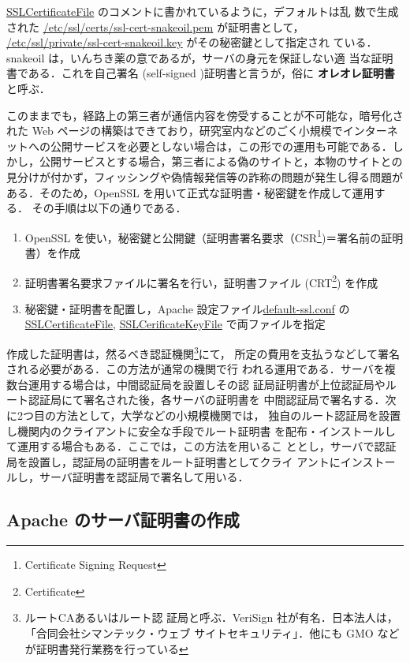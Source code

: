 \url{SSLCertificateFile} のコメントに書かれているように，デフォルトは乱
数で生成された \url{/etc/ssl/certs/ssl-cert-snakeoil.pem} が証明書として，
\url{/etc/ssl/private/ssl-cert-snakeoil.key} がその秘密鍵として指定され
ている．snakeoil は，いんちき薬の意であるが，サーバの身元を保証しない適
当な証明書である．これを自己署名 (self-signed )証明書と言うが，俗に
\textbf{オレオレ証明書}と呼ぶ．

このままでも，経路上の第三者が通信内容を傍受することが不可能な，暗号化さ
れた Web ページの構築はできており，研究室内などのごく小規模でインターネ
ットへの公開サービスを必要としない場合は，この形での運用も可能である．し
かし，公開サービスとする場合，第三者による偽のサイトと，本物のサイトとの
見分けが付かず，フィッシングや偽情報発信等の詐称の問題が発生し得る問題が
ある．そのため，OpenSSL を用いて正式な証明書・秘密鍵を作成して運用する．
その手順は以下の通りである．

\begin{enumerate}
 \item OpenSSL を使い，秘密鍵と公開鍵（証明書署名要求（CSR\footnote{Certificate Signing Request})＝署名前の証明書）を作成
 \item 証明書署名要求ファイルに署名を行い，証明書ファイル (CRT\footnote{Certificate}) を作成
 \item 秘密鍵・証明書を配置し，Apache 設定ファイル\url{default-ssl.conf} の\url{SSLCertificateFile}, \url{SSLCerificateKeyFile} で両ファイルを指定
\end{enumerate}

作成した証明書は，然るべき認証機関\footnote{ルートCAあるいはルート認
証局と呼ぶ．VeriSign 社が有名．日本法人は，「合同会社シマンテック・ウェブ
サイトセキュリティ」．他にも GMO などが証明書発行業務を行っている}にて，
所定の費用を支払うなどして署名される必要がある．この方法が通常の機関で行
われる運用である．サーバを複数台運用する場合は，中間認証局を設置しその認
証局証明書が上位認証局やルート認証局にて署名された後，各サーバの証明書を
中間認証局で署名する．次に2つ目の方法として，大学などの小規模機関では，
独自のルート認証局を設置し機関内のクライアントに安全な手段でルート証明書
を配布・インストールして運用する場合もある．ここでは，この方法を用いるこ
ととし，サーバで認証局を設置し，認証局の証明書をルート証明書としてクライ
アントにインストールし，サーバ証明書を認証局で署名して用いる．

\subsection{Apache のサーバ証明書の作成}

